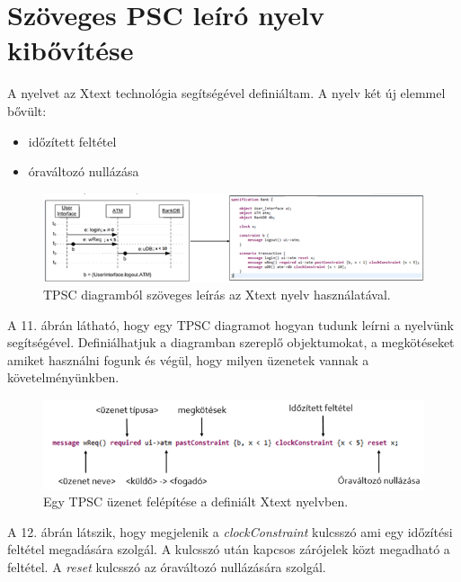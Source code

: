 \chapter{Szöveges PSC leíró nyelv kibővítése}

A nyelvet az Xtext technológia segítségével definiáltam. A nyelv két új elemmel bővült:
\begin{itemize}
    \item időzített feltétel
    \item óraváltozó nullázása
\end{itemize}

\begin{figure}[!ht]
    \centering
    \includegraphics[width=150mm, keepaspectratio]{figures/11abra.png}
    \caption{TPSC diagramból szöveges leírás az Xtext nyelv használatával.}
\end{figure}

A 11. ábrán látható, hogy egy TPSC diagramot hogyan tudunk leírni a nyelvünk segítségével. Definiálhatjuk a diagramban szereplő objektumokat, a megkötéseket amiket használni fogunk és végül, hogy milyen üzenetek vannak a követelményünkben.

\begin{figure}[!ht]
    \centering
    \includegraphics[width=150mm, keepaspectratio]{figures/12abra.png}
    \caption{Egy TPSC üzenet felépítése a definiált Xtext nyelvben.}
\end{figure}

A 12. ábrán látszik, hogy megjelenik a \textit{clockConstraint} kulcsszó ami egy időzítési feltétel megadására szolgál. A kulcsszó után kapcsos zárójelek közt megadható a feltétel. A \textit{reset} kulcsszó az óraváltozó nullázására szolgál.